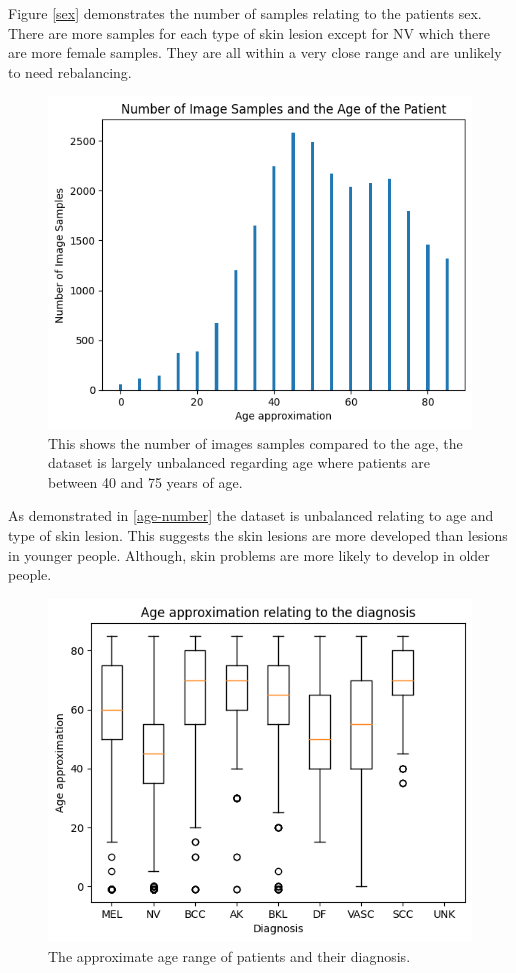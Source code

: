 Figure \ref{sex} demonstrates the number of samples relating to the patients sex. There are more samples for each type of skin lesion except for NV which there are more female samples. They are all within a very close range and are unlikely to need rebalancing.

\begin{figure}
	\centering
	\includegraphics[]{images/ISIC/age-number.png}
	\caption{This shows the number of images samples compared to the age, the dataset is largely unbalanced regarding age where patients are between 40 and 75 years of age.} 
\end{figure} \label{age-number}

As demonstrated in \ref{age-number} the dataset is unbalanced relating to age and type of skin lesion. This suggests the skin lesions are more developed than lesions in younger people. Although, skin problems are more likely to develop in older people.

\begin{figure}
	\centering
	\includegraphics[]{images/ISIC/diagnosis-age.png}
	\caption{The approximate age range of patients and their diagnosis.} 
\end{figure} \label{diagnosis-age}

